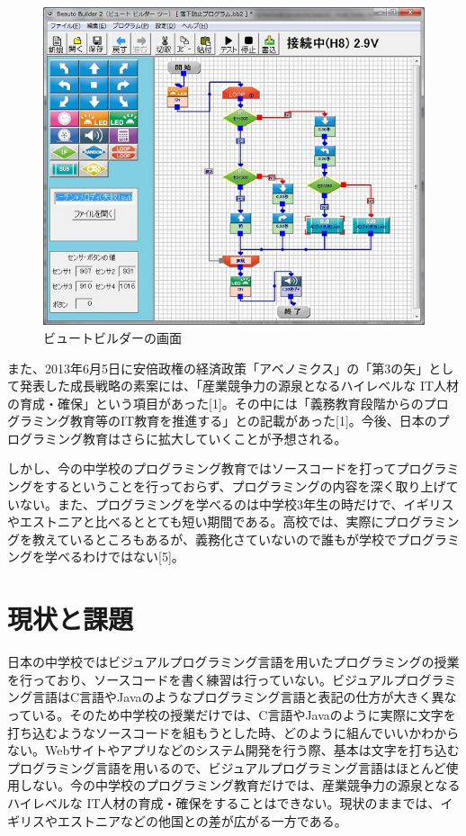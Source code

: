 \documentclass[openany,11pt,papersize]{jsbook}
\begin{document}
\begin{figure}[H]
\begin{center}
\includegraphics[width=15cm, bb=0 0 1206 1050]{img/Byudo.jpg}
\end{center}
\caption{ビュートビルダーの画面}
\end{figure}
また、2013年6月5日に安倍政権の経済政策「アベノミクス」の「第3の矢」として発表した成長戦略の素案には、「産業競争力の源泉となるハイレベルな IT人材の育成・確保」という項目があった[1]。その中には「義務教育段階からのプログラミング教育等のIT教育を推進する」との記載があった[1]。今後、日本のプログラミング教育はさらに拡大していくことが予想される。

しかし、今の中学校のプログラミング教育ではソースコードを打ってプログラミングをするということを行っておらず、プログラミングの内容を深く取り上げていない。また、プログラミングを学べるのは中学校3年生の時だけで、イギリスやエストニアと比べるととても短い期間である。高校では、実際にプログラミングを教えているところもあるが、義務化さていないので誰もが学校でプログラミングを学べるわけではない[5]。

\section{現状と課題}
日本の中学校ではビジュアルプログラミング言語を用いたプログラミングの授業を行っており、ソースコードを書く練習は行っていない。ビジュアルプログラミング言語はC言語やJavaのようなプログラミング言語と表記の仕方が大きく異なっている。そのため中学校の授業だけでは、C言語やJavaのように実際に文字を打ち込むようなソースコードを組もうとした時、どのように組んでいいかわからない。Webサイトやアプリなどのシステム開発を行う際、基本は文字を打ち込むプログラミング言語を用いるので、ビジュアルプログラミング言語はほとんど使用しない。今の中学校のプログラミング教育だけでは、産業競争力の源泉となるハイレベルな IT人材の育成・確保をすることはできない。現状のままでは、イギリスやエストニアなどの他国との差が広がる一方である。
\end{document}
